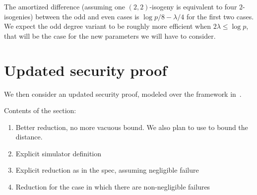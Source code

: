 \documentclass[envcountsect,envcountsame,orivec,runningheads,a4paper]{llncs}
\begin{document}
The amortized difference (assuming one $(2,2)$-isogeny is equivalent to four $2$-isogenies) between the odd and even cases is $\log p /8 - \lambda/4$ for the first two cases.
We expect the odd degree variant to be roughly more efficient when $2 \lambda \leq  \log p$, that will be the case for the new parameters we will have to consider.

\section{Updated security proof}
We then consider an updated security proof, modeled over the framework in~\cite{C:ABDPW25}. 

Contents of the section:
\begin{enumerate}
    \item Better reduction, no more vacuous bound.  We also plan to use \cite[Proposition 1]{cryptoeprint:2026/1775} to bound the distance.
    \item Explicit simulator definition
    \item Explicit reduction as in the spec, assuming negligible failure
    \item Reduction for the case in which there are non-negligible failures
\end{enumerate}


\end{document}
